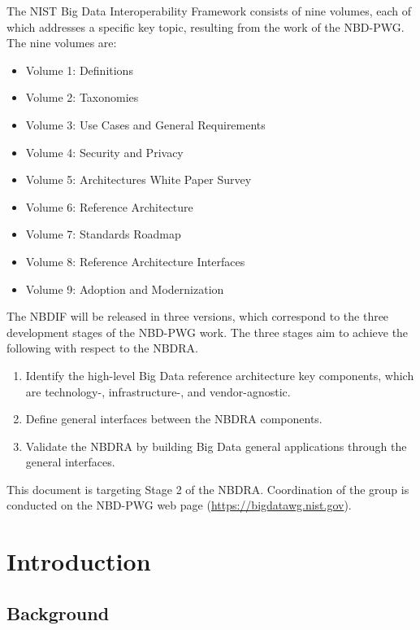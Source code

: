 \documentclass[9pt,]{article}
\providecommand{\tightlist}{%
  \setlength{\itemsep}{0pt}\setlength{\parskip}{0pt}}
\begin{document}
The NIST Big Data Interoperability Framework consists of nine volumes,
each of which addresses a specific key topic, resulting from the work of
the NBD-PWG. The nine volumes are:

\begin{itemize}
\tightlist
\item
  Volume 1: Definitions
\item
  Volume 2: Taxonomies
\item
  Volume 3: Use Cases and General Requirements
\item
  Volume 4: Security and Privacy
\item
  Volume 5: Architectures White Paper Survey
\item
  Volume 6: Reference Architecture
\item
  Volume 7: Standards Roadmap
\item
  Volume 8: Reference Architecture Interfaces
\item
  Volume 9: Adoption and Modernization
\end{itemize}

The NBDIF will be released in three versions, which correspond to the
three development stages of the NBD-PWG work. The three stages aim to
achieve the following with respect to the NBDRA.

\begin{enumerate}
\def\labelenumi{\arabic{enumi}.}
\tightlist
\item
  Identify the high-level Big Data reference architecture key
  components, which are technology-, infrastructure-, and
  vendor-agnostic.
\item
  Define general interfaces between the NBDRA components.
\item
  Validate the NBDRA by building Big Data general applications through
  the general interfaces.
\end{enumerate}

This document is targeting Stage 2 of the NBDRA. Coordination of the
group is conducted on the NBD-PWG web page
(\url{https://bigdatawg.nist.gov}).

\hypertarget{introduction}{%
\section{Introduction}\label{introduction}}

\hypertarget{background}{%
\subsection{Background}\label{background}}
\end{document}
